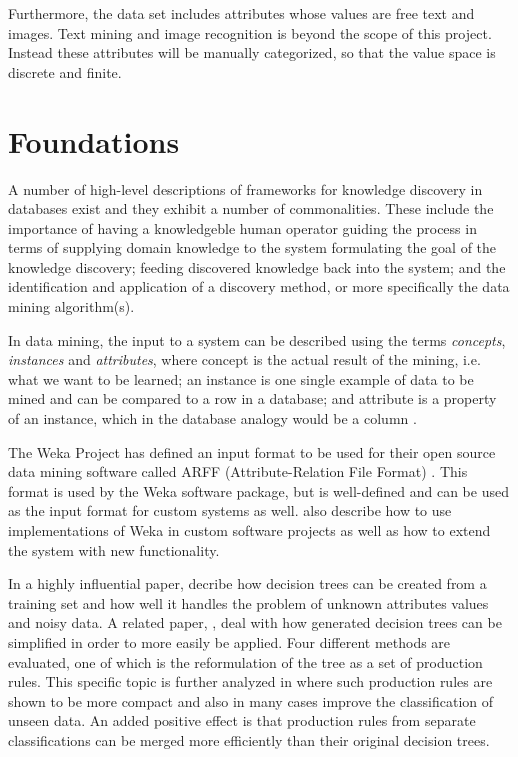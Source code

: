 \documentclass[a4paper]{article}
\begin{document}
Furthermore, the data set includes attributes whose values are free text and images. Text mining and image recognition is beyond
the scope of this project. Instead these attributes will be manually categorized, so that the value space is discrete and finite.

\section{Foundations}
A number of high-level descriptions of frameworks for knowledge discovery in databases exist \citep{Fayyad1996, Frawley1992}
and they exhibit a number of commonalities. These include the importance of having a knowledgeble human operator guiding the
process in terms of supplying domain knowledge to the system formulating the goal of the knowledge discovery; feeding discovered
knowledge back into the system; and the identification and application of a discovery method, or more specifically the data mining
algorithm(s).

In data mining, the input to a system can be described using the terms \emph{concepts}, \emph{instances} and \emph{attributes},
where concept is the actual result of the mining, i.e. what we want to be learned; an instance is one single example of data to be
mined and can be compared to a row in a database; and attribute is a property of an instance, which in the database analogy would
be a column \citep{Witten2011}.

The Weka Project has defined an input format to be used for their open source data mining software called ARFF (Attribute-Relation
File Format) \citep{Garner1995, Witten2011}. This format is used by the Weka software package, but is well-defined and can be used
as the input format for custom systems as well. \citet{Witten2011} also describe how to use implementations of Weka in custom
software projects as well as how to extend the system with new functionality.

In a highly influential paper, \citet{Quinlan1986} decribe how decision trees can be created from a training set and how well it
handles the problem of unknown attributes values and noisy data. A related paper, \citet{Quinlan1987}, deal with how generated
decision trees can be simplified in order to more easily be applied. Four different methods are evaluated, one of which is the
reformulation of the tree as a set of production rules. This specific topic is further analyzed in \citet{Quinlan1987b} where such
production rules are shown to be more compact and also in many cases improve the classification of unseen data. An added positive
effect is that production rules from separate classifications can be merged more efficiently than their original decision trees.
\end{document}
